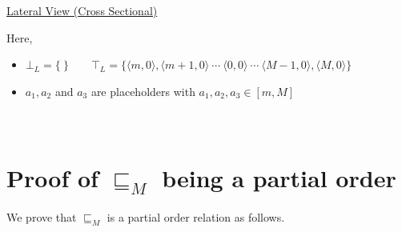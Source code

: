 \documentclass[final,3p, review, times]{Elsevier/elsarticle}
\begin{document}
\centerline{\underline{\Large{Lateral View (Cross Sectional)}}}

Here,
\begin{itemize}
  \item $\bot_L=\big\{\ \big\}\qquad\top_L=\big\{\langle m,0\rangle,\langle m+1,0\rangle\ \cdots\ \langle 0,0\rangle\ \cdots\ \langle M-1,0\rangle,\langle M,0\rangle\big\}$
  \item $a_1,a_2$ and $a_3$ are placeholders with $a_1,a_2,a_3\in[m,M]$
\end{itemize}















\section{\\Proof of $\sqsubseteq_M$ being a partial order}
\label{app:interval_partial}

We prove that $\sqsubseteq_M$ is a partial order relation as follows.
\end{document}
